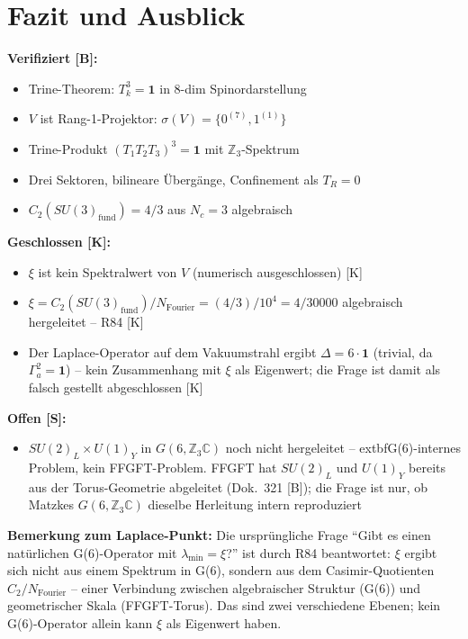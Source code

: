 \section{Fazit und Ausblick}

\begin{keyresult}
\textbf{Verifiziert [B]:}
\begin{itemize}
  \item Trine-Theorem: $T_k^3 = \mathbf{1}$ in 8-dim Spinordarstellung
  \item $V$ ist Rang-1-Projektor: $\sigma(V) = \{0^{(7)}, 1^{(1)}\}$
  \item Trine-Produkt $(T_1T_2T_3)^3 = \mathbf{1}$ mit $\mathbb{Z}_3$-Spektrum
  \item Drei Sektoren, bilineare Übergänge, Confinement als $T_R = 0$
  \item $C_2(SU(3)_{\text{fund}}) = 4/3$ aus $N_c = 3$ algebraisch
\end{itemize}
\textbf{Geschlossen [K]:}
\begin{itemize}
  \item $\xi$ ist kein Spektralwert von $V$ (numerisch ausgeschlossen) [K]
  \item $\xi = C_2(SU(3)_{\text{fund}})/N_{\text{Fourier}} = (4/3)/10^4 = 4/30000$
    algebraisch hergeleitet -- R84 [K]
  \item Der Laplace-Operator auf dem Vakuumstrahl ergibt $\Delta = 6\cdot\mathbf{1}$
    (trivial, da $\Gamma_a^2 = \mathbf{1}$) -- kein Zusammenhang mit $\xi$
    als Eigenwert; die Frage ist damit als falsch gestellt abgeschlossen [K]
\end{itemize}
\textbf{Offen [S]:}
\begin{itemize}
  \item $SU(2)_L\times U(1)_Y$ in $G(6,\mathbb{Z}_3\mathbb{C})$
    noch nicht hergeleitet -- 	extbf{G(6)-internes Problem, kein FFGFT-Problem}.
    FFGFT hat $SU(2)_L$ und $U(1)_Y$ bereits aus der Torus-Geometrie
    abgeleitet (Dok.~321 [B]); die Frage ist nur, ob Matzkes
    $G(6,\mathbb{Z}_3\mathbb{C})$ dieselbe Herleitung intern reproduziert
\end{itemize}
\textbf{Bemerkung zum Laplace-Punkt:} Die ursprüngliche Frage
``Gibt es einen natürlichen G(6)-Operator mit $\lambda_{\min} = \xi$?''
ist durch R84 beantwortet: $\xi$ ergibt sich nicht aus einem Spektrum
in G(6), sondern aus dem Casimir-Quotienten $C_2/N_{\text{Fourier}}$ --
einer Verbindung zwischen algebraischer Struktur (G(6)) und geometrischer
Skala (FFGFT-Torus). Das sind zwei verschiedene Ebenen; kein G(6)-Operator
allein kann $\xi$ als Eigenwert haben.
\end{keyresult}

